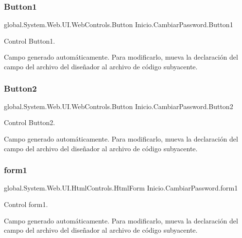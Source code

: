 \subsubsection{\texorpdfstring{Button1}{Button1}}
{\footnotesize\ttfamily global.\+System.\+Web.\+U\+I.\+Web\+Controls.\+Button Inicio.\+Cambiar\+Password.\+Button1\hspace{0.3cm}{\ttfamily [protected]}}



Control Button1. 

Campo generado automáticamente. Para modificarlo, mueva la declaración del campo del archivo del diseñador al archivo de código subyacente. \mbox{\label{class_inicio_1_1_cambiar_password_ab2a855fe05cc706ac07c6308af3dcc54}} 
\subsubsection{\texorpdfstring{Button2}{Button2}}
{\footnotesize\ttfamily global.\+System.\+Web.\+U\+I.\+Web\+Controls.\+Button Inicio.\+Cambiar\+Password.\+Button2\hspace{0.3cm}{\ttfamily [protected]}}



Control Button2. 

Campo generado automáticamente. Para modificarlo, mueva la declaración del campo del archivo del diseñador al archivo de código subyacente. \mbox{\label{class_inicio_1_1_cambiar_password_a14ad331c75f392329019b277a2d2c8d9}} 
\subsubsection{\texorpdfstring{form1}{form1}}
{\footnotesize\ttfamily global.\+System.\+Web.\+U\+I.\+Html\+Controls.\+Html\+Form Inicio.\+Cambiar\+Password.\+form1\hspace{0.3cm}{\ttfamily [protected]}}



Control form1. 

Campo generado automáticamente. Para modificarlo, mueva la declaración del campo del archivo del diseñador al archivo de código subyacente. \mbox{\label{class_inicio_1_1_cambiar_password_a54fe9058b0b1415263161ac543de2e4f}} 
